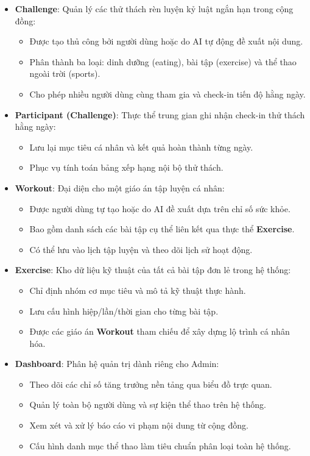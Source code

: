 \begin{itemize}
    \item \textbf{Challenge}: Quản lý các thử thách rèn luyện kỷ luật ngắn hạn trong cộng đồng:
    \begin{itemize}
        \item Được tạo thủ công bởi người dùng hoặc do AI tự động đề xuất nội dung.
        \item Phân thành ba loại: dinh dưỡng (eating), bài tập (exercise) và thể thao ngoài trời (sports).
        \item Cho phép nhiều người dùng cùng tham gia và check-in tiến độ hằng ngày.
    \end{itemize}

    \item \textbf{Participant (Challenge)}: Thực thể trung gian ghi nhận check-in thử thách hằng ngày:
    \begin{itemize}
        \item Lưu lại mục tiêu cá nhân và kết quả hoàn thành từng ngày.
        \item Phục vụ tính toán bảng xếp hạng nội bộ thử thách.
    \end{itemize}

    \item \textbf{Workout}: Đại diện cho một giáo án tập luyện cá nhân:
    \begin{itemize}
        \item Được người dùng tự tạo hoặc do AI đề xuất dựa trên chỉ số sức khỏe.
        \item Bao gồm danh sách các bài tập cụ thể liên kết qua thực thể \textbf{Exercise}.
        \item Có thể lưu vào lịch tập luyện và theo dõi lịch sử hoạt động.
    \end{itemize}

    \item \textbf{Exercise}: Kho dữ liệu kỹ thuật của tất cả bài tập đơn lẻ trong hệ thống:
    \begin{itemize}
        \item Chỉ định nhóm cơ mục tiêu và mô tả kỹ thuật thực hành.
        \item Lưu cấu hình hiệp/lần/thời gian cho từng bài tập.
        \item Được các giáo án \textbf{Workout} tham chiếu để xây dựng lộ trình cá nhân hóa.
    \end{itemize}

    \item \textbf{Dashboard}: Phân hệ quản trị dành riêng cho Admin:
    \begin{itemize}
        \item Theo dõi các chỉ số tăng trưởng nền tảng qua biểu đồ trực quan.
        \item Quản lý toàn bộ người dùng và sự kiện thể thao trên hệ thống.
        \item Xem xét và xử lý báo cáo vi phạm nội dung từ cộng đồng.
        \item Cấu hình danh mục thể thao làm tiêu chuẩn phân loại toàn hệ thống.
    \end{itemize}


\end{itemize}
